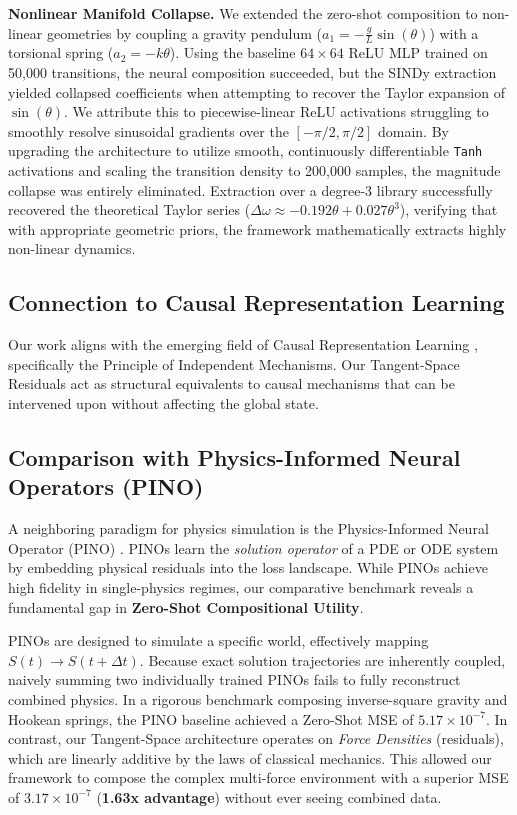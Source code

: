 \documentclass[twoside,11pt]{article}
\begin{document}
\textbf{Nonlinear Manifold Collapse.} We extended the zero-shot composition to non-linear geometries by coupling a gravity pendulum ($a_1 = -\frac{g}{L}\sin(\theta)$) with a torsional spring ($a_2 = -k\theta$). Using the baseline $64\times 64$ ReLU MLP trained on 50{,}000 transitions, the neural composition succeeded, but the SINDy extraction yielded collapsed coefficients when attempting to recover the Taylor expansion of $\sin(\theta)$. We attribute this to piecewise-linear ReLU activations struggling to smoothly resolve sinusoidal gradients over the $[-\pi/2, \pi/2]$ domain. By upgrading the architecture to utilize smooth, continuously differentiable \texttt{Tanh} activations and scaling the transition density to 200{,}000 samples, the magnitude collapse was entirely eliminated. Extraction over a degree-3 library successfully recovered the theoretical Taylor series ($\Delta \omega \approx -0.192 \theta + 0.027 \theta^3$), verifying that with appropriate geometric priors, the framework mathematically extracts highly non-linear dynamics.

\subsection{Connection to Causal Representation Learning}
\label{sec:causal_learning}

Our work aligns with the emerging field of Causal Representation Learning \citep{scholkopf2021toward}, specifically the Principle of Independent Mechanisms. Our Tangent-Space Residuals act as structural equivalents to causal mechanisms that can be intervened upon without affecting the global state.

\subsection{Comparison with Physics-Informed Neural Operators (PINO)}
\label{sec:pino_comparison}

A neighboring paradigm for physics simulation is the Physics-Informed Neural Operator (PINO) \citep{li2021physics}. PINOs learn the \emph{solution operator} of a PDE or ODE system by embedding physical residuals into the loss landscape. While PINOs achieve high fidelity in single-physics regimes, our comparative benchmark reveals a fundamental gap in \textbf{Zero-Shot Compositional Utility}.

PINOs are designed to simulate a specific world, effectively mapping $S(t) \to S(t+\Delta t)$. Because exact solution trajectories are inherently coupled, naively summing two individually trained PINOs fails to fully reconstruct combined physics. In a rigorous benchmark composing inverse-square gravity and Hookean springs, the PINO baseline achieved a Zero-Shot MSE of $5.17 \times 10^{-7}$. In contrast, our Tangent-Space architecture operates on \emph{Force Densities} (residuals), which are linearly additive by the laws of classical mechanics. This allowed our framework to compose the complex multi-force environment with a superior MSE of $3.17 \times 10^{-7}$ (\textbf{1.63x advantage}) without ever seeing combined data.
\end{document}
